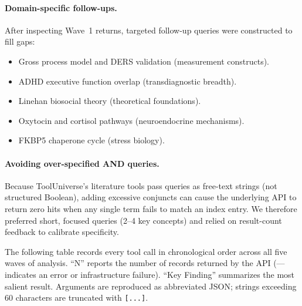 \paragraph{Domain-specific follow-ups.}
After inspecting Wave~1 returns, targeted follow-up queries were constructed
to fill gaps:
\begin{itemize}[nosep]
  \item Gross process model and DERS validation (measurement constructs).
  \item ADHD executive function overlap (transdiagnostic breadth).
  \item Linehan biosocial theory (theoretical foundations).
  \item Oxytocin and cortisol pathways (neuroendocrine mechanisms).
  \item FKBP5 chaperone cycle (stress biology).
\end{itemize}

\paragraph{Avoiding over-specified AND queries.}
Because ToolUniverse's literature tools pass queries as free-text strings
(not structured Boolean), adding excessive conjuncts can cause the
underlying API to return zero hits when any single term fails to match an
index entry.  We therefore preferred short, focused queries (2--4 key
concepts) and relied on result-count feedback to calibrate specificity.



The following table records every tool call in chronological order across
all five waves of analysis.  ``N'' reports the number of records returned
by the API (--- indicates an error or infrastructure failure).  ``Key
Finding'' summarizes the most salient result.  Arguments are reproduced
as abbreviated JSON; strings exceeding 60 characters are truncated with
\texttt{[...]}.

